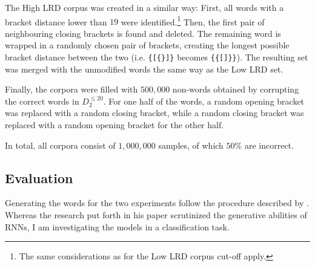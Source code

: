 The High LRD corpus was created in a similar way: First, all words with a bracket distance lower than $19$ were identified.\footnote{The same considerations as for the Low LRD corpus cut-off apply.} Then, the first pair of neighbouring closing brackets is found and deleted. The remaining word is wrapped in a randomly chosen pair of brackets, creating the longest possible bracket distance between the two (i.e. \texttt{\{[\{\}]\}} becomes \texttt{\{\{[]\}\}}). The resulting set was merged with the unmodified words the same way as the Low LRD set.

Finally, the corpora were filled with $500{,}000$ non-words obtained by corrupting the correct words in $D_{2}^{\leq 20}$. For one half of the words, a random opening bracket was replaced with a random closing bracket, while a random closing bracket was replaced with a random opening bracket for the other half.

In total, all corpora consist of $1{,}000{,}000$ samples, of which $50\%$ are incorrect.
\subsection{Evaluation}\label{evaluation}
Generating the words for the two experiments follow the procedure described by \cite{Bernardy2018}. Whereas the research put forth in his paper scrutinized the generative abilities of RNNs, I am investigating the models in a classification task.

